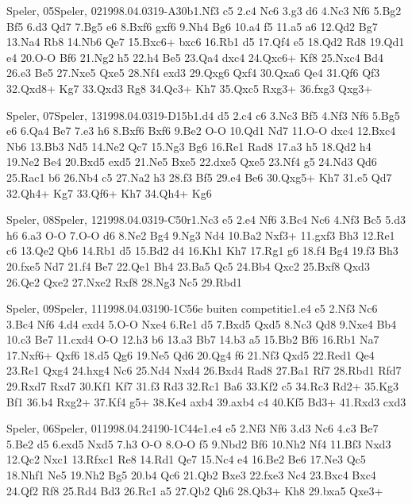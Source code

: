 \documentclass[twocolumn,a4paper,10pt]{report}
\begin{document}
\begin{chessgame}{Speler, 05}{Speler, 02}{1998.04.03}{19}{\textonehalf-\textonehalf}{A30b}{1.Nf3 c5 2.c4 Nc6 3.g3 d6 4.Nc3 Nf6 5.Bg2 Bf5 6.d3 Qd7 7.Bg5 e6 8.Bxf6 gxf6 9.Nh4 Bg6 10.a4 f5 11.a5 a6 12.Qd2 Bg7 13.Na4 Rb8 14.Nb6 Qe7 15.Bxc6+ bxc6 16.Rb1 d5 17.Qf4 e5 18.Qd2 Rd8 19.Qd1 e4 20.O-O Bf6 21.Ng2 h5 22.h4 Be5 23.Qa4 dxc4 24.Qxc6+ Kf8 25.Nxc4 Bd4 26.e3 Be5 27.Nxe5 Qxe5 28.Nf4 exd3 29.Qxg6 Qxf4 30.Qxa6 Qe4 31.Qf6 Qf3 32.Qxd8+ Kg7 33.Qxd3 Rg8 34.Qc3+ Kh7 35.Qxc5 Rxg3+ 36.fxg3 Qxg3+}\end{chessgame}
\begin{chessgame}{Speler, 07}{Speler, 13}{1998.04.03}{19}{\textonehalf-\textonehalf}{D15b}{1.d4 d5 2.c4 c6 3.Nc3 Bf5 4.Nf3 Nf6 5.Bg5 e6 6.Qa4 Be7 7.e3 h6 8.Bxf6 Bxf6 9.Be2 O-O 10.Qd1 Nd7 11.O-O dxc4 12.Bxc4 Nb6 13.Bb3 Nd5 14.Ne2 Qc7 15.Ng3 Bg6 16.Re1 Rad8 17.a3 h5 18.Qd2 h4 19.Ne2 Be4 20.Bxd5 exd5 21.Ne5 Bxe5 22.dxe5 Qxe5 23.Nf4 g5 24.Nd3 Qd6 25.Rac1 b6 26.Nb4 c5 27.Na2 h3 28.f3 Bf5 29.e4 Be6 30.Qxg5+ Kh7 31.e5 Qd7 32.Qh4+ Kg7 33.Qf6+ Kh7 34.Qh4+ Kg6}\end{chessgame}
\begin{chessgame}{Speler, 08}{Speler, 12}{1998.04.03}{19}{\textonehalf-\textonehalf}{C50r}{1.Nc3 e5 2.e4 Nf6 3.Bc4 Nc6 4.Nf3 Bc5 5.d3 h6 6.a3 O-O 7.O-O d6 8.Ne2 Bg4 9.Ng3 Nd4 10.Ba2 Nxf3+ 11.gxf3 Bh3 12.Re1 c6 13.Qe2 Qb6 14.Rb1 d5 15.Bd2 d4 16.Kh1 Kh7 17.Rg1 g6 18.f4 Bg4 19.f3 Bh3 20.fxe5 Nd7 21.f4 Be7 22.Qe1 Bh4 23.Ba5 Qc5 24.Bb4 Qxc2 25.Bxf8 Qxd3 26.Qe2 Qxe2 27.Nxe2 Rxf8 28.Ng3 Nc5 29.Rbd1}\end{chessgame}
\begin{chessgame}{Speler, 09}{Speler, 11}{1998.04.03}{19}{0-1}{C56e buiten competitie}{1.e4 e5 2.Nf3 Nc6 3.Bc4 Nf6 4.d4 exd4 5.O-O Nxe4 6.Re1 d5 7.Bxd5 Qxd5 8.Nc3 Qd8 9.Nxe4 Bb4 10.c3 Be7 11.cxd4 O-O 12.h3 b6 13.a3 Bb7 14.b3 a5 15.Bb2 Bf6 16.Rb1 Na7 17.Nxf6+ Qxf6 18.d5 Qg6 19.Ne5 Qd6 20.Qg4 f6 21.Nf3 Qxd5 22.Red1 Qe4 23.Re1 Qxg4 24.hxg4 Nc6 25.Nd4 Nxd4 26.Bxd4 Rad8 27.Ba1 Rf7 28.Rbd1 Rfd7 29.Rxd7 Rxd7 30.Kf1 Kf7 31.f3 Rd3 32.Rc1 Ba6 33.Kf2 c5 34.Rc3 Rd2+ 35.Kg3 Bf1 36.b4 Rxg2+ 37.Kf4 g5+ 38.Ke4 axb4 39.axb4 c4 40.Kf5 Bd3+ 41.Rxd3 cxd3}\end{chessgame}
\begin{chessgame}{Speler, 06}{Speler, 01}{1998.04.24}{19}{0-1}{C44e}{1.e4 e5 2.Nf3 Nf6 3.d3 Nc6 4.c3 Be7 5.Be2 d5 6.exd5 Nxd5 7.h3 O-O 8.O-O f5 9.Nbd2 Bf6 10.Nh2 Nf4 11.Bf3 Nxd3 12.Qc2 Nxc1 13.Rfxc1 Re8 14.Rd1 Qe7 15.Nc4 e4 16.Be2 Be6 17.Ne3 Qc5 18.Nhf1 Ne5 19.Nh2 Bg5 20.b4 Qc6 21.Qb2 Bxe3 22.fxe3 Nc4 23.Bxc4 Bxc4 24.Qf2 Rf8 25.Rd4 Bd3 26.Rc1 a5 27.Qb2 Qh6 28.Qb3+ Kh8 29.bxa5 Qxe3+}\end{chessgame}
\end{document}
